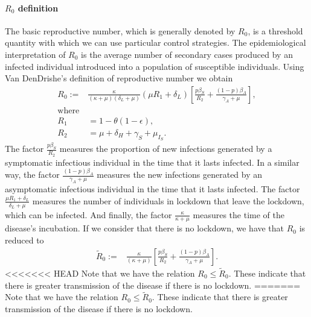 \paragraph{$R_0$ definition}
%
The basic reproductive number, which is generally denoted by $ R_0 $,
is a threshold quantity with which we can use 
particular control strategies. The epidemiological interpretation of 
$ R_0 $ is the average number of secondary cases produced by an infected
individual introduced into a population of susceptible individuals.
Using Van DenDrishe's \cite{VandenDriessche2017a} definition of reproductive number
we obtain
\begin{equation*}
    \label{eqn:reproductive_number}
    \begin{aligned}
        R_0 :=
        &
        \frac{\kappa}{(\kappa + \mu)(\delta_L + \mu)}
        \left(
            \mu R_1 + \delta_L
        \right)
        \left[
            \frac{p\beta_S}{R_2}
            +\frac{(1 - p) \beta_A}{\gamma_A+\mu}
        \right],
    \\
    \text{where} &
    \\
        R_1 &= 1 - \theta(1 - \epsilon),
    \\
        R_2 &= \mu + \delta_H + \gamma_S + \mu_{I_{S}}.
    \end{aligned}
\end{equation*}
%
The factor $\frac{p\beta_S}{R_2}$ measures the proportion of new infections
generated by a symptomatic infectious individual in the time that it lasts
infected. In a similar way, the factor $\frac{(1 - p) \beta_A}{\gamma_A+\mu}$
measures the new infections generated by an asymptomatic infectious individual
in the time that it lasts infected. The factor 
$\frac{\mu R_1 + \delta_L}{\delta_L + \mu}$ measures the number
of individuals in lockdown that leave the lockdown, which can be infected.
And finally, the factor $\frac{\kappa}{\kappa + \mu}$ measures
the time of the disease's incubation.
%
If we consider that there is no lockdown, we have that $ R_0 $ is reduced to
\begin{equation*}
    \label{eqn:reproductive_number}
    \begin{aligned}
        \tilde{R}_0 :=
        &
        \frac{\kappa}{(\kappa + \mu)}
        \left[
            \frac{p\beta_S}{R_2}
            +\frac{(1 - p) \beta_A}{\gamma_A+\mu}
        \right].
    \end{aligned}
\end{equation*}
%
<<<<<<< HEAD
Note that we have the relation $ R_0 \leq \tilde{R}_0 $. These indicate that there is greater
 transmission of the disease if there is no lockdown.
%
=======
Note that we have the relation $ R_0 \leq \tilde{R}_0 $. These indicate that there is greater transmission of the disease if there is no lockdown.

